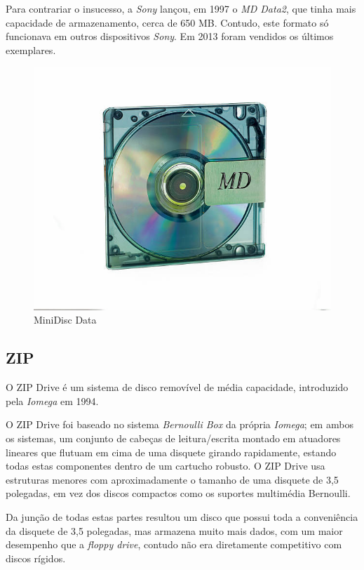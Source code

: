 \documentclass{report}
\begin{document}
	Para contrariar o insucesso, a \textit{Sony} lançou, em 1997 o \textit{MD Data2}, que tinha mais capacidade de armazenamento, cerca de 650 MB. Contudo, este formato só funcionava em outros dispositivos \textit{Sony}.
	Em 2013 foram vendidos os últimos exemplares.	

\begin{figure} [h]
	\centering
	\includegraphics[scale=0.4]{MD_data.jpg}
	\caption{MiniDisc Data}
\end{figure}

\newpage	
			
		\subsection{ZIP}
	
	O ZIP Drive é um sistema de disco removível de média capacidade, introduzido pela \textit{Iomega} em 1994.
\vspace{1mm}

	O ZIP Drive foi baseado no sistema \textit{Bernoulli Box} da própria \textit{Iomega}; em ambos os sistemas, um conjunto de cabeças de leitura/escrita montado em atuadores lineares que flutuam em cima de uma disquete girando rapidamente, estando todas estas componentes dentro de um cartucho robusto. O ZIP Drive usa estruturas menores com aproximadamente o tamanho de uma disquete de 3,5 polegadas, em vez dos discos compactos como os suportes multimédia Bernoulli.
\vspace{1mm}

	Da junção de todas estas partes resultou um disco que possui toda a conveniência da disquete de 3,5 polegadas, mas armazena muito mais dados, com um maior desempenho que a \textit{floppy drive}, contudo não era diretamente competitivo com discos rígidos.
\vspace{1mm}
	
\end{document}
